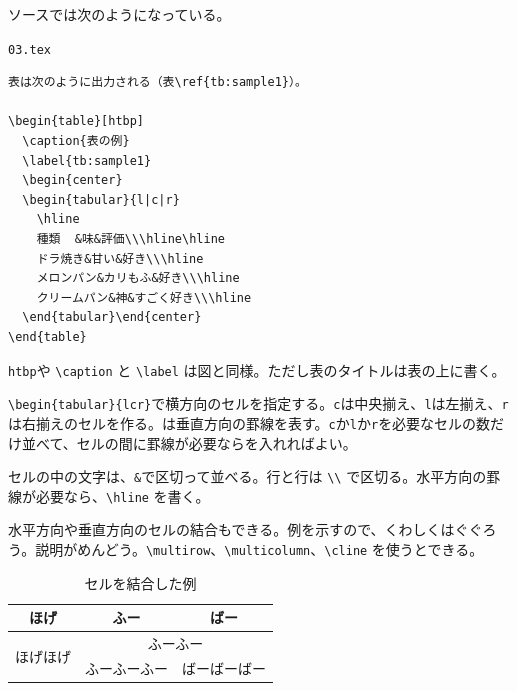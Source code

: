ソースでは次のようになっている。

\begin{itembox}[l]{{\tt 03.tex}}
\begin{verbatim}
表は次のように出力される（表\ref{tb:sample1}）。

\begin{table}[htbp]
  \caption{表の例}
  \label{tb:sample1}
  \begin{center}
  \begin{tabular}{l|c|r}
    \hline
    種類	&味&評価\\\hline\hline
    ドラ焼き&甘い&好き\\\hline
    メロンパン&カリもふ&好き\\\hline
    クリームパン&神&すごく好き\\\hline
  \end{tabular}\end{center}
\end{table}
\end{verbatim}
\end{itembox}

{\tt htbp}や \verb|\caption| と \verb|\label| は図と同様。ただし表のタイトルは表の上に書く。

\verb|\begin{tabular}{l|{\tt \textbar}{\tt c}{\tt \textbar}\verb|r}|で横方向のセルを指定する。{\tt c}は中央揃え、{\tt l}は左揃え、{\tt r}は右揃えのセルを作る。{\tt \textbar}は垂直方向の罫線を表す。{\tt c}か{\tt l}か{\tt r}を必要なセルの数だけ並べて、セルの間に罫線が必要なら{\tt \textbar}を入れればよい。

セルの中の文字は、{\tt \&}で区切って並べる。行と行は \verb|\\| で区切る。水平方向の罫線が必要なら、\verb|\hline| を書く。

水平方向や垂直方向のセルの結合もできる。例を示すので、くわしくはぐぐろう。説明がめんどう。\verb|\multirow|、\verb|\multicolumn|、\verb|\cline| を使うとできる。

\begin{table}[htbp]
  \caption{セルを結合した例}
  \label{tb:sample2}
  \begin{center}
  \begin{tabular}{c|c|c}
    \hline
    ほげ&ふー&ばー\\\hline\hline
    \multirow{2}{*}{ほげほげ}&\multicolumn{2}{c}{ふーふー} \\\cline{2-3}
    &ふーふーふー&ばーばーばー\\\hline
  \end{tabular}
  \end{center}
\end{table}

